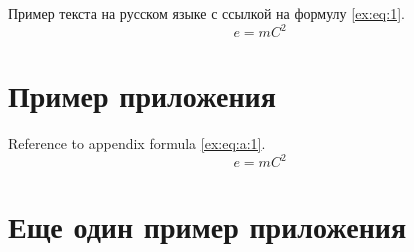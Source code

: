 \documentclass[xelatex,big]{G7-32-2017}
\begin{document}
Пример текста на русском языке с ссылкой на формулу \eqref{ex:eq:1}.
\begin{equation}
    \label{ex:eq:1}
    e = mC^2
\end{equation}

\backmatter

\Conclusion

\lipsum[1-5]


\appendix

\chapter{Пример приложения}

\lipsum[3-5]

Reference to appendix formula \eqref{ex:eq:a:1}.
\begin{equation}
    \label{ex:eq:a:1}
    e = mC^2
\end{equation}

\chapter{Еще один пример приложения}

\lipsum[1-2]




% 

% 





% 


% 


% 
% 
\end{document}
